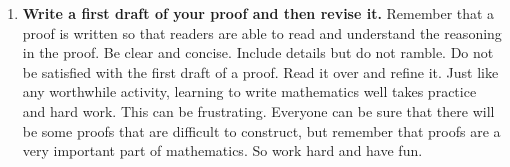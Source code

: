 \begin{enumerate}
\item \textbf{Write a first draft of your proof and then revise it.}
Remember that a proof is written so that readers are able to read and understand the reasoning in the proof.  Be clear and concise.  Include details but do not ramble.  Do not be satisfied with the first draft of a proof.  Read it over and refine it.  Just like any worthwhile activity, learning to write mathematics well takes practice and hard work.  This can be frustrating.  Everyone can be sure that there will be some proofs that are difficult to construct, but remember that proofs are a very important part of mathematics.  So work hard and have fun.

\end{enumerate}

\endinput
